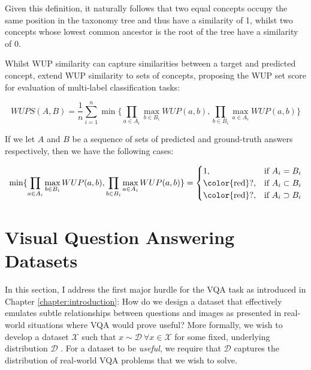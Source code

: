 Given this definition, it naturally follows that two equal concepts occupy the same position in the taxonomy tree and thus have a similarity of 1, whilst two concepts whose lowest common ancestor is the root of the tree have a similarity of 0.

Whilst WUP similarity can capture similarities between a target and predicted concept, \citeauthor{malinowski2014multiworld} extend WUP similarity to sets of concepts, proposing the WUP set score for evaluation of multi-label classification tasks:

\[WUPS(A, B) = \frac{1}{n} \sum_{i=1}^n \min \{\prod_{a \in A_i} \max_{b \in B_i} WUP(a, b), \prod_{b \in B_i} \max_{a \in A_i} WUP(a, b)\}\]

If we let \(A\) and \(B\) be a sequence of sets of predicted and ground-truth answers respectively, then we have the following cases:

\[
\min \{\prod_{a \in A_i} \max_{b \in B_i} WUP(a, b), \prod_{b \in B_i} \max_{a \in A_i} WUP(a, b)\} =  \begin{cases}
    1, &\text{if } A_i = B_i \\
    \text{\color{red}?}, &\text{if } A_i \subset B_i \\
    \text{\color{red}?}, &\text{if } A_i \supset B_i
\end{cases}
\]

\section{Visual Question Answering Datasets}
\label{section:vqa_datasets}

In this section, I address the first major hurdle for the VQA task as introduced in Chapter \ref{chapter:introduction}: How do we design a dataset that effectively emulates subtle relationships between questions and images as presented in real-world situations where VQA would prove useful? More formally, we wish to develop a dataset \(\mathcal{X}\) such that \(x \sim \mathcal{D}\ \forall x \in \mathcal{X}\) for some fixed, underlying distribution \(\mathcal{D}\) \cite{mohri2018foundations}. For a dataset to be \textit{useful}, we require that \(\mathcal{D}\) captures the distribution of real-world VQA problems that we wish to solve.

